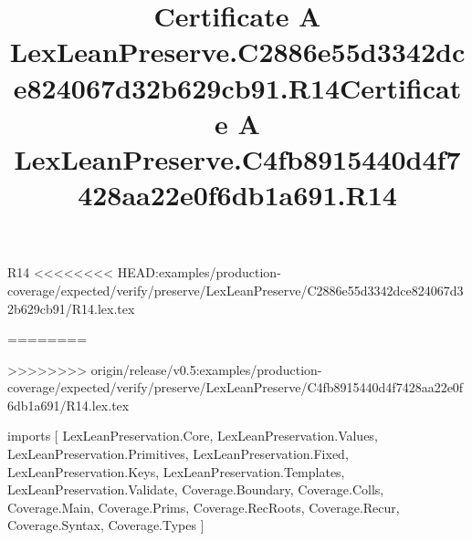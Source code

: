 \begin{lexlean}{R14}
<<<<<<<< HEAD:examples/production-coverage/expected/verify/preserve/LexLeanPreserve/C2886e55d3342dce824067d32b629cb91/R14.lex.tex
\title{Certificate A LexLeanPreserve.C2886e55d3342dce824067d32b629cb91.R14}
========
\title{Certificate A LexLeanPreserve.C4fb8915440d4f7428aa22e0f6db1a691.R14}
>>>>>>>> origin/release/v0.5:examples/production-coverage/expected/verify/preserve/LexLeanPreserve/C4fb8915440d4f7428aa22e0f6db1a691/R14.lex.tex
\begin{coremodule}
imports [
  LexLeanPreservation.Core,
  LexLeanPreservation.Values,
  LexLeanPreservation.Primitives,
  LexLeanPreservation.Fixed,
  LexLeanPreservation.Keys,
  LexLeanPreservation.Templates,
  LexLeanPreservation.Validate,
  Coverage.Boundary,
  Coverage.Colls,
  Coverage.Main,
  Coverage.Prims,
  Coverage.RecRoots,
  Coverage.Recur,
  Coverage.Syntax,
  Coverage.Types
]


\end{coremodule}
\end{lexlean}
